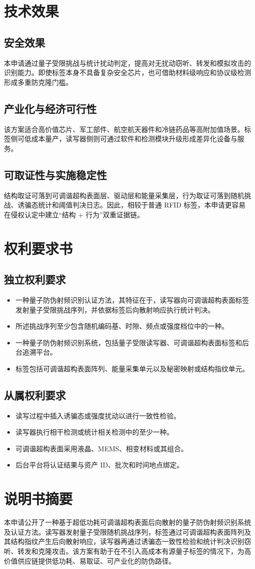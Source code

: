 ﻿\documentclass[12pt,a4paper]{article}
\begin{document}
\section{技术效果}
\subsection{安全效果}
本申请通过量子受限挑战与统计扰动判定，提高对无扰动窃听、转发和模拟攻击的识别能力。即使标签本身不具备复杂安全芯片，也可借助材料级响应和协议级检测形成多重防克隆门槛。

\subsection{产业化与经济可行性}
该方案适合高价值芯片、军工部件、航空航天器件和冷链药品等高附加值场景。标签侧可低成本量产，读写器侧则可通过软件和检测模块升级形成差异化设备与服务。

\subsection{可取证性与实施稳定性}
结构取证可落到可调谐超构表面层、驱动层和能量采集层，行为取证可落到随机挑战、诱骗态统计和阈值判决日志。因此，相较于普通 RFID 标签，本申请更容易在侵权认定中建立“结构 + 行为”双重证据链。

\section{权利要求书}
\subsection{独立权利要求}
\begin{itemize}
\item 一种量子防伪射频识别认证方法，其特征在于，读写器向可调谐超构表面标签发射量子受限挑战序列，并依据标签后向散射响应执行统计判决。
\item 所述挑战序列至少包含随机编码基、时隙、频点或强度档位中的一种。
\item 一种量子防伪射频识别系统，包括量子受限读写器、可调谐超构表面标签和后台追溯平台。
\item 标签包括可调谐超构表面阵列、能量采集单元以及秘密映射或结构指纹单元。
\end{itemize}

\subsection{从属权利要求}
\begin{itemize}
\item 读写过程中插入诱骗态或强度扰动以进行一致性检验。
\item 读写器执行相干检测或统计相关检测中的至少一种。
\item 可调谐超构表面采用液晶、MEMS、相变材料或其组合。
\item 后台平台将认证结果与资产 ID、批次和时间地点绑定。
\end{itemize}

\section{说明书摘要}
本申请公开了一种基于超低功耗可调谐超构表面后向散射的量子防伪射频识别系统及认证方法。读写器发射量子受限随机挑战序列，标签通过可调谐超构表面阵列及其结构指纹产生后向散射响应，读写器再通过诱骗态一致性检验和统计判决识别窃听、转发和克隆攻击。该方案有助于在不引入高成本有源量子标签的情况下，为高价值供应链提供低功耗、易取证、可产业化的防伪路径。
\end{document}
